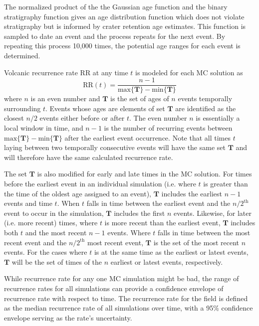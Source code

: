 \documentclass[12pt,letter]{article}
\begin{document}
The normalized product of the the Gaussian age function and the binary stratigraphy function gives an age distribution function which does not violate stratigraphy but is informed by crater retention age estimates. This function is sampled to date an event and the process repeats for the next event. By repeating this process 10,000 times, the potential age ranges for each event is determined.

Volcanic recurrence rate RR at any time $t$ is modeled for each MC solution as
\begin{equation}
\text{RR}(t) = \frac{n-1}{\text{max}\{\mathbf{T}\} - \text{min}\{\mathbf{T}\}}
\label{eq_RR}
\end{equation}
where $n$ is an even number and $\mathbf{T}$ is the set of ages of $n$ events temporally surrounding $t$. Events whose ages are elements of set $\mathbf{T}$ are identified as the closest $n/2$ events either before or after $t$. The even number $n$ is essentially a local window in time, and $n-1$ is the number of recurring events between $\text{max}\{\mathbf{T}\}-\text{min}\{\mathbf{T}\}$ after the earliest event occurrence. Note that all times $t$ laying between two temporally consecutive events will have the same set $\mathbf{T}$ and will therefore have the same calculated recurrence rate.

The set $\mathbf{T}$ is also modified for early and late times in the MC solution. For times before the earliest event in an individual simulation (i.e. where $t$ is greater than the time of the oldest age assigned to an event), $\mathbf{T}$ includes the earliest $n-1$ events and time $t$. When $t$ falls in time between the earliest event and the $n/2^{\text{th}}$ event to occur in the simulation, $\mathbf{T}$ includes the first $n$ events. Likewise, for later (i.e. more recent) times, where $t$ is more recent than the earliest event, $\mathbf{T}$ includes both $t$ and the most recent $n-1$ events. Where $t$ falls in time between the most recent event and the $n/2^{\text{th}}$ most recent event, $\mathbf{T}$ is the set of the most recent $n$ events. For the cases where $t$ is at the same time as the earliest or latest events, $\mathbf{T}$ will be the set of times of the $n$ earliest or latest events, respectively.

While recurrence rate for any one MC simulation might be bad, the range of recurrence rates for all simulations can provide a confidence envelope of recurrence rate with respect to time. The recurrence rate for the field is defined as the median recurrence rate of all simulations over time, with a 95\% confidence envelope serving as the rate's uncertainty.
\end{document}
